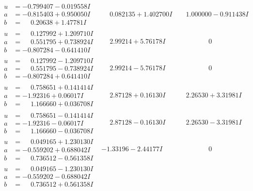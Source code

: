 \documentclass[1p]{elsarticle_modified}
\theoremstyle{definition}
\begin{document}
$$\begin{array}{c|c|c}
\begin{aligned}
u &= -0.799407 - 0.019558 I \\
a &= -0.815403 + 0.950050 I \\
b &= \phantom{-}0.20638 + 1.47781 I\end{aligned}
 & \phantom{-}0.082135 + 1.402700 I & \phantom{-}1.000000 - 0.911438 I \\ \hline\begin{aligned}
u &= \phantom{-}0.127992 + 1.209710 I \\
a &= \phantom{-}0.551795 + 0.738924 I \\
b &= -0.807284 - 0.641410 I\end{aligned}
 & \phantom{-}2.99214 + 5.76178 I & \phantom{-0.000000 } 0 \\ \hline\begin{aligned}
u &= \phantom{-}0.127992 - 1.209710 I \\
a &= \phantom{-}0.551795 - 0.738924 I \\
b &= -0.807284 + 0.641410 I\end{aligned}
 & \phantom{-}2.99214 - 5.76178 I & \phantom{-0.000000 } 0 \\ \hline\begin{aligned}
u &= \phantom{-}0.758651 + 0.141414 I \\
a &= -1.92316 + 0.06017 I \\
b &= \phantom{-}1.166660 + 0.036708 I\end{aligned}
 & \phantom{-}2.87128 + 0.16130 I & \phantom{-}2.26530 + 3.31981 I \\ \hline\begin{aligned}
u &= \phantom{-}0.758651 - 0.141414 I \\
a &= -1.92316 - 0.06017 I \\
b &= \phantom{-}1.166660 - 0.036708 I\end{aligned}
 & \phantom{-}2.87128 - 0.16130 I & \phantom{-}2.26530 - 3.31981 I \\ \hline\begin{aligned}
u &= \phantom{-}0.049165 + 1.230130 I \\
a &= -0.559202 + 0.688042 I \\
b &= \phantom{-}0.736512 - 0.561358 I\end{aligned}
 & -1.33196 - 2.44177 I & \phantom{-0.000000 } 0 \\ \hline\begin{aligned}
u &= \phantom{-}0.049165 - 1.230130 I \\
a &= -0.559202 - 0.688042 I \\
b &= \phantom{-}0.736512 + 0.561358 I\end{aligned}

\end{array}$$
\end{document}
